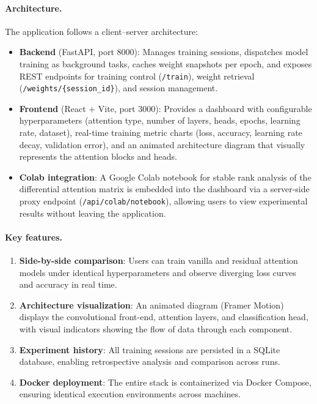 \documentclass[12pt, a4paper]{article}
\begin{document}
\paragraph{Architecture.}
The application follows a client--server architecture:
\begin{itemize}[leftmargin=1.5em]
    \item \textbf{Backend} (FastAPI, port 8000): Manages training
          sessions, dispatches model training as background tasks,
          caches weight snapshots per epoch, and exposes REST endpoints
          for training control (\texttt{/train}), weight retrieval
          (\texttt{/weights/\{session\_id\}}), and session management.
    \item \textbf{Frontend} (React + Vite, port 3000): Provides a
          dashboard with configurable hyperparameters (attention type,
          number of layers, heads, epochs, learning rate, dataset),
          real-time training metric charts (loss, accuracy, learning
          rate decay, validation error), and an animated architecture
          diagram that visually represents the attention blocks and
          heads.
    \item \textbf{Colab integration}: A Google Colab notebook for
          stable rank analysis of the differential attention matrix is
          embedded into the dashboard via a server-side proxy endpoint
          (\texttt{/api/colab/notebook}), allowing users to view
          experimental results without leaving the application.
\end{itemize}

\paragraph{Key features.}
\begin{enumerate}[label=(\roman*)]
    \item \textbf{Side-by-side comparison}: Users can train vanilla and
          residual attention models under identical hyperparameters and
          observe diverging loss curves and accuracy in real time.
    \item \textbf{Architecture visualization}: An animated diagram
          (Framer Motion) displays the convolutional front-end,
          attention layers, and classification head, with visual
          indicators showing the flow of data through each component.
    \item \textbf{Experiment history}: All training sessions are
          persisted in a SQLite database, enabling retrospective
          analysis and comparison across runs.
    \item \textbf{Docker deployment}: The entire stack is containerized
          via Docker Compose, ensuring identical execution environments
          across machines.
\end{enumerate}
\end{document}
